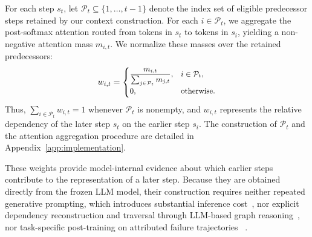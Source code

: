 For each step $s_t$, let
$
    \mathcal{P}_t
    \subseteq
    \{1,\ldots,t-1\}
$
denote the index set of eligible predecessor steps retained by our context
construction.
For each $i\in\mathcal{P}_t$, we aggregate the post-softmax attention routed
from tokens in $s_t$ to tokens in $s_i$, yielding a non-negative attention
mass $m_{i,t}$.
We normalize these masses over the retained predecessors:
\begin{equation}
\small
    w_{i,t}
    =
    \begin{cases}
        \displaystyle
        \frac{m_{i,t}}
             {\sum_{j\in\mathcal{P}_t}m_{j,t}},
        & i\in\mathcal{P}_t,\\[1.2ex]
        0,
        & \text{otherwise}.
    \end{cases}
    \label{eq:dependency-weight}
\end{equation}
Thus,
$
    \sum_{i\in\mathcal{P}_t}w_{i,t}=1
$
whenever $\mathcal{P}_t$ is nonempty, and $w_{i,t}$ represents the relative
dependency of the later step $s_t$ on the earlier step $s_i$.
The construction of $\mathcal{P}_t$ and the attention aggregation procedure
are detailed in Appendix~\ref{app:implementation}.

These weights provide model-internal evidence about which earlier steps
contribute to the representation of a later step.
Because they are obtained directly from the frozen LLM model, their
construction requires neither repeated generative prompting, which
introduces substantial inference cost~\citep{whoandwhen,oat}, nor explicit
dependency reconstruction and traversal through LLM-based graph
reasoning~\citep{falat,chief,bakish2026adaptive}, nor task-specific
post-training on attributed failure trajectories
~\citep{agentracer,graphtracer}.









